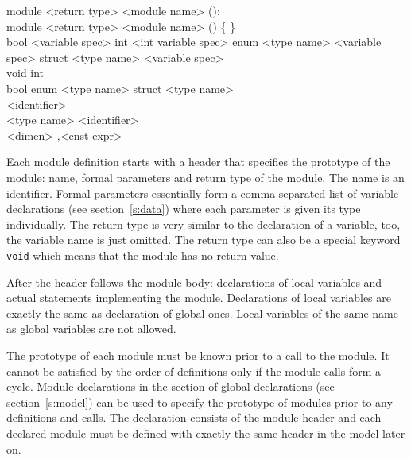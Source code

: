 \documentclass[a4paper,11pt,titlepage,english]{article}
\begin{document}
\begin{bnfgrammar}
 \is module
                         <return type> <module name> (); \\
[module definition] \is module
                        <return type> <module name> () \{ 
                        \}\\
[parameter] \is bool <variable spec> \or int <int variable spec>
    \or enum <type name> <variable spec>
    \or struct <type name> <variable spec> \\
[return type] \is void 
    \or int \optional{[<dimen>]}\optional{[<dimen>]}
     \optional{[<dimen>]}\optional{[<dimen>]} \\
[data type] \is bool \or enum <type name> \or struct <type name> \\
[module name] \is <identifier> \\
<type name> \is <identifier> \\
<dimen>  ,<cnst expr> \\
\end{bnfgrammar}

Each module definition starts with a header that specifies the prototype of
the module: name, formal parameters and return type of the module. The name
is an identifier. Formal parameters essentially form a comma-separated list
of variable declarations (see section~\ref{s:data}) where each parameter is
given its type individually. The return type is very similar to the declaration
of a variable, too, the variable name is just omitted. The return type can
also be a special keyword \verb|void| which means that the module has no
return value.

After the header follows the module body: declarations of local variables
and actual statements implementing the module. Declarations of local
variables are exactly the same as declaration of global ones. Local
variables of the same name as global variables are not allowed. 

The prototype of each module must be known prior to a call to the module.
It cannot be satisfied by the order of definitions only if the module calls
form a cycle.  Module declarations in the section of global declarations
(see section~\ref{s:model}) can be used to specify the prototype of modules
prior to any definitions and calls. The declaration consists of the module
header and each declared module must be defined with exactly the same
header in the model later on. 
\end{document}
